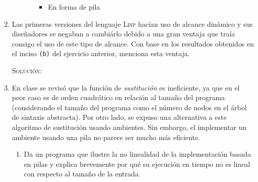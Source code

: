 \documentclass[letterpaper,11pt]{article}
\begin{document}
\begin{enumerate}
\begin{enumerate}
\begin{itemize}
\begin{itemize}
                \item En forma de pila
                \begin{center}
                \begin{drawstack}[scale=1.78]
                \end{drawstack}
                \end{center}
            \end{itemize}
        \end{itemize}
    \end{enumerate}
    
    \newpage
    \item Las primeras versiones del lenguaje \textsc{Lisp} hacían uso de 
    alcance dinámico y sus diseñadores se negaban a cambiárlo debido a una 
    gran ventaja que traía consigo el uso de este tipo de alcance. Con base 
    en los resultados obtenidos en el inciso \texttt{(b)} del ejercicio 
    anterior, menciona esta ventaja.

    \textsc{Solución:}



   \item En clase se revisó que la función de \textit{sustitución} es 
   ineficiente, ya que en el peor caso es de orden cuadrático en relación 
   al tamaño del programa (considerando el tamaño del programa como el 
   número de nodos en el árbol de sintaxis abstracta). Por otro lado, se 
   expuso una alternativa a este algoritmo de sustitución usando 
   ambientes. Sin embargo, el implementar un ambiente usando una pila no 
   parece ser mucho más eficiente.
   \begin{enumerate}
        \item Da un programa que ilustre la no linealidad de la implementación
        basada en pilas y explica brevemente por qué su ejecución en tiempo no
        es lineal con respecto al tamaño de la entrada.


\end{enumerate}
\end{enumerate}
\end{document}
